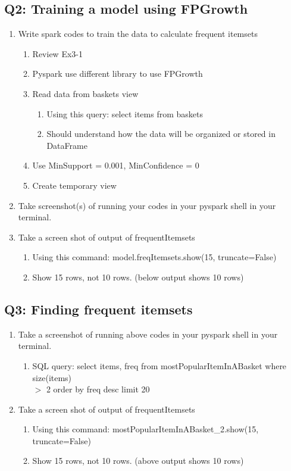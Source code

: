 \documentclass[]{article}
\begin{document}
\subsection*{Q2: Training a model using FPGrowth}
\begin{enumerate}[before=\itshape,label=\arabic*.]
	\item Write spark codes to train the data to calculate frequent itemsets
	\begin{enumerate}[before=\itshape,label=\alph*.]
		\item Review Ex3-1
		\item Pyspark use different library to use FPGrowth
		\item Read data from baskets view
		\begin{enumerate}[before=\itshape,label=\roman*.]
			\item Using this query: select items from baskets
			\item Should understand how the data will be organized or stored in DataFrame
		\end{enumerate}
		\item Use MinSupport = 0.001, MinConfidence = 0
		\item Create temporary view
	\end{enumerate}
	\item Take screenshot(s) of running your codes in your pyspark shell in your terminal.
	\item Take a screen shot of output of frequentItemsets
	\begin{enumerate}[before=\itshape,label=\alph*.]
		\item Using this command: model.freqItemsets.show(15, truncate=False)
		\item Show 15 rows, not 10 rows. (below output shows 10 rows)
	\end{enumerate}
\end{enumerate} 

\subsection*{Q3: Finding frequent itemsets}
\begin{enumerate}[before=\itshape,label=\arabic*.]
	\item Take a screenshot of running above codes in your pyspark shell in your terminal.
	\begin{enumerate}[before=\itshape,label=\alph*.]
		\item SQL query: select items, freq from mostPopularItemInABasket where size(items) \\ $>$ 2 order by freq desc limit 20
	\end{enumerate}
	\item Take a screen shot of output of frequentItemsets
	\begin{enumerate}[before=\itshape,label=\alph*.]
		\item Using this command: mostPopularItemInABasket\_2.show(15, truncate=False)
		\item Show 15 rows, not 10 rows. (above output shows 10 rows)
	\end{enumerate}
\end{enumerate} 
\end{document}
